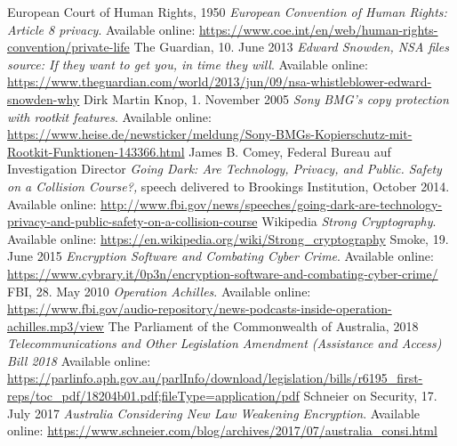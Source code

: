 \documentclass[a4paper, 11pt]{article}
\begin{document}
\begin{thebibliography}{9}
     European Court of Human Rights, 1950 \emph{European Convention of Human Rights: Article 8  privacy}. Available online: \href{https://www.coe.int/en/web/human-rights-convention/private-life}{https://www.coe.int/en/web/human-rights-convention/private-life}
     The Guardian, 10. June 2013 \emph{Edward Snowden, NSA files source: If they want to get you, in time they will}. Available online: \href{https://www.theguardian.com/world/2013/jun/09/nsa-whistleblower-edward-snowden-why}{https://www.theguardian.com/world/2013/jun/09/nsa-whistleblower-edward-snowden-why}
     Dirk Martin Knop, 1. November 2005 \emph{Sony BMG's copy protection with rootkit features}. Available online: \href{https://www.heise.de/newsticker/meldung/Sony-BMGs-Kopierschutz-mit-Rootkit-Funktionen-143366.html}{https://www.heise.de/newsticker/meldung/Sony-BMGs-Kopierschutz-mit-Rootkit-Funktionen-143366.html}
     James B. Comey, Federal Bureau auf Investigation Director \emph{Going Dark: Are Technology, Privacy, and Public. Safety on a Collision Course?,} speech delivered to Brookings Institution, October 2014. Available online: \href{http://www.fbi.gov/news/speeches/going-dark-are-technology-privacy-and-public-safety-on-a-collision-course}{http://www.fbi.gov/news/speeches/going-dark-are-technology-privacy-and-public-safety-on-a-collision-course}
     Wikipedia \emph{Strong Cryptography}. Available online: \href{https://en.wikipedia.org/wiki/Strong\_cryptography}{https://en.wikipedia.org/wiki/Strong\_cryptography}
     Smoke, 19. June 2015 \emph{Encryption Software and Combating Cyber Crime}. Available online: \href{https://www.cybrary.it/0p3n/encryption-software-and-combating-cyber-crime/}{https://www.cybrary.it/0p3n/encryption-software-and-combating-cyber-crime/}
     FBI, 28. May 2010 \emph{Operation Achilles}. Available online: \href{https://www.fbi.gov/audio-repository/news-podcasts-inside-operation-achilles.mp3/view}{https://www.fbi.gov/audio-repository/news-podcasts-inside-operation-achilles.mp3/view}
     The Parliament of the Commonwealth of Australia, 2018 \emph{Telecommunications and Other Legislation Amendment (Assistance and Access) Bill 2018} Available online: \href{https://parlinfo.aph.gov.au/parlInfo/download/legislation/bills/r6195\_first-reps/toc\_pdf/18204b01.pdf;fileType=application/pdf}{https://parlinfo.aph.gov.au/parlInfo/download/legislation/bills/r6195\_first-reps/toc\_pdf/18204b01.pdf;fileType=application/pdf}
     Schneier on Security, 17. July 2017 \emph{Australia Considering New Law Weakening Encryption}. Available online: \href{https://www.schneier.com/blog/archives/2017/07/australia\_consi.html}{https://www.schneier.com/blog/archives/2017/07/australia\_consi.html}
\end{thebibliography}
\end{document}
